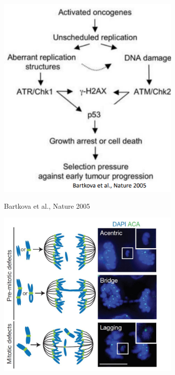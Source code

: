 \begin{figure}[!htb]
   \begin{minipage}{0.48\textwidth}
     \centering
    \includegraphics[width=0.8\textwidth]{../_resources/13c8849fd53903e2747fc9cc1a31fa57.png}  
\caption{Bartkova et al., Nature 2005}
\label{fig:bartkova}
   \end{minipage}\hfill
   \begin{minipage}{0.48\textwidth}
     \centering
    \includegraphics[width=0.8\textwidth]{../_resources/0a2601fb2d9e7056294ad4c26f178951.png}  
\caption{}
\label{fig:defects}
   \end{minipage}
\end{figure}

